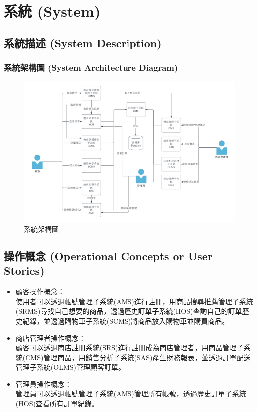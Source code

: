 \documentclass[a4paper, 12pt]{article}
\begin{document}
\newpage

\section{系統 (System)}
\subsection{系統描述 (System Description)}
\subsubsection{系統架構圖 (System Architecture Diagram) }

\begin{figure}[h]
    \centering
    \includegraphics[width=40em]{System-Architecture-Diagram.png}
    \caption{系統架構圖}
    \label{fig:enter-label}
\end{figure}


\subsection{操作概念 (Operational Concepts or User Stories)}
\begin{itemize}
 
\item 顧客操作概念： \\
\setlength{\parindent}{2em} 使用者可以透過帳號管理子系統(AMS)進行註冊，用商品搜尋推薦管理子系統(SRMS)尋找自己想要的商品，透過歷史訂單子系統(HOS)查詢自己的訂單歷史紀錄，並透過購物車子系統(SCMS)將商品放入購物車並購買商品。
\item 商店管理者操作概念： \\
\setlength{\parindent}{2em} 顧客可以透過商店註冊系統(SRS)進行註冊成為商店管理者，用商品管理子系統(CMS)管理商品，用銷售分析子系統(SAS)產生財務報表，並透過訂單配送管理子系統(OLMS)管理顧客訂單。
\item 管理員操作概念： \\
\setlength{\parindent}{2em} 管理員可以透過帳號管理子系統(AMS)管理所有帳號，透過歷史訂單子系統(HOS)查看所有訂單紀錄。

\end{itemize}
\end{document}
